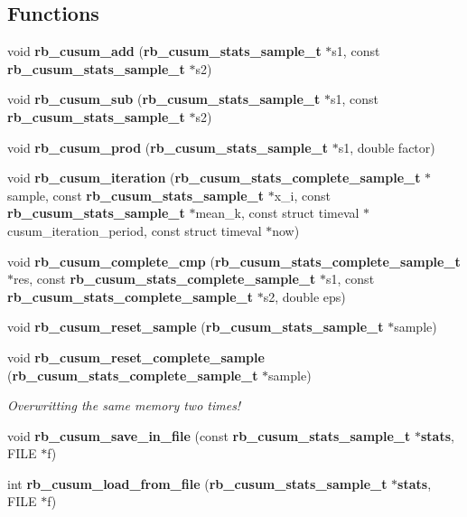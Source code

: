\subsection*{Functions}
\begin{DoxyCompactItemize}
\item 
void {\bf rb\+\_\+cusum\+\_\+add} ({\bf rb\+\_\+cusum\+\_\+stats\+\_\+sample\+\_\+t} $\ast$s1, const {\bf rb\+\_\+cusum\+\_\+stats\+\_\+sample\+\_\+t} $\ast$s2)
\item 
void {\bf rb\+\_\+cusum\+\_\+sub} ({\bf rb\+\_\+cusum\+\_\+stats\+\_\+sample\+\_\+t} $\ast$s1, const {\bf rb\+\_\+cusum\+\_\+stats\+\_\+sample\+\_\+t} $\ast$s2)
\item 
void {\bf rb\+\_\+cusum\+\_\+prod} ({\bf rb\+\_\+cusum\+\_\+stats\+\_\+sample\+\_\+t} $\ast$s1, double factor)
\item 
void {\bf rb\+\_\+cusum\+\_\+iteration} ({\bf rb\+\_\+cusum\+\_\+stats\+\_\+complete\+\_\+sample\+\_\+t} $\ast$sample, const {\bf rb\+\_\+cusum\+\_\+stats\+\_\+sample\+\_\+t} $\ast$x\+\_\+i, const {\bf rb\+\_\+cusum\+\_\+stats\+\_\+sample\+\_\+t} $\ast$mean\+\_\+k, const struct timeval $\ast$cusum\+\_\+iteration\+\_\+period, const struct timeval $\ast$now)
\item 
void {\bf rb\+\_\+cusum\+\_\+complete\+\_\+cmp} ({\bf rb\+\_\+cusum\+\_\+stats\+\_\+complete\+\_\+sample\+\_\+t} $\ast$res, const {\bf rb\+\_\+cusum\+\_\+stats\+\_\+complete\+\_\+sample\+\_\+t} $\ast$s1, const {\bf rb\+\_\+cusum\+\_\+stats\+\_\+complete\+\_\+sample\+\_\+t} $\ast$s2, double eps)
\item 
void {\bf rb\+\_\+cusum\+\_\+reset\+\_\+sample} ({\bf rb\+\_\+cusum\+\_\+stats\+\_\+sample\+\_\+t} $\ast$sample)
\item 
void {\bf rb\+\_\+cusum\+\_\+reset\+\_\+complete\+\_\+sample} ({\bf rb\+\_\+cusum\+\_\+stats\+\_\+complete\+\_\+sample\+\_\+t} $\ast$sample)
\begin{DoxyCompactList}\small\item\em Overwritting the same memory two times! \end{DoxyCompactList}\item 
void {\bf rb\+\_\+cusum\+\_\+save\+\_\+in\+\_\+file} (const {\bf rb\+\_\+cusum\+\_\+stats\+\_\+sample\+\_\+t} $\ast${\bf stats}, F\+I\+L\+E $\ast$f)
\item 
int {\bf rb\+\_\+cusum\+\_\+load\+\_\+from\+\_\+file} ({\bf rb\+\_\+cusum\+\_\+stats\+\_\+sample\+\_\+t} $\ast${\bf stats}, F\+I\+L\+E $\ast$f)
\end{DoxyCompactItemize}


